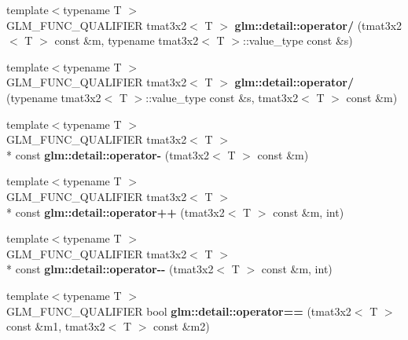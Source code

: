 \begin{DoxyCompactItemize}
\item 
\hypertarget{namespaceglm_1_1detail_abf9a2912b5030543839df113662d0687}{{\footnotesize template$<$typename T $>$ }\\G\-L\-M\-\_\-\-F\-U\-N\-C\-\_\-\-Q\-U\-A\-L\-I\-F\-I\-E\-R tmat3x2$<$ T $>$ {\bfseries glm\-::detail\-::operator/} (tmat3x2$<$ T $>$ const \&m, typename tmat3x2$<$ T $>$\-::value\-\_\-type const \&s)}\label{namespaceglm_1_1detail_abf9a2912b5030543839df113662d0687}

\item 
\hypertarget{namespaceglm_1_1detail_ab6af57d8d78531808ca7412b8b5ac4bd}{{\footnotesize template$<$typename T $>$ }\\G\-L\-M\-\_\-\-F\-U\-N\-C\-\_\-\-Q\-U\-A\-L\-I\-F\-I\-E\-R tmat3x2$<$ T $>$ {\bfseries glm\-::detail\-::operator/} (typename tmat3x2$<$ T $>$\-::value\-\_\-type const \&s, tmat3x2$<$ T $>$ const \&m)}\label{namespaceglm_1_1detail_ab6af57d8d78531808ca7412b8b5ac4bd}

\item 
\hypertarget{namespaceglm_1_1detail_a59b73f54f24948e966ad476164b9acb7}{{\footnotesize template$<$typename T $>$ }\\G\-L\-M\-\_\-\-F\-U\-N\-C\-\_\-\-Q\-U\-A\-L\-I\-F\-I\-E\-R tmat3x2$<$ T $>$\\*
 const {\bfseries glm\-::detail\-::operator-\/} (tmat3x2$<$ T $>$ const \&m)}\label{namespaceglm_1_1detail_a59b73f54f24948e966ad476164b9acb7}

\item 
\hypertarget{namespaceglm_1_1detail_afbedf96a311aecbfd5298ea7ade78b1a}{{\footnotesize template$<$typename T $>$ }\\G\-L\-M\-\_\-\-F\-U\-N\-C\-\_\-\-Q\-U\-A\-L\-I\-F\-I\-E\-R tmat3x2$<$ T $>$\\*
 const {\bfseries glm\-::detail\-::operator++} (tmat3x2$<$ T $>$ const \&m, int)}\label{namespaceglm_1_1detail_afbedf96a311aecbfd5298ea7ade78b1a}

\item 
\hypertarget{namespaceglm_1_1detail_a3643210bac979028c8ee5f440d9d6cab}{{\footnotesize template$<$typename T $>$ }\\G\-L\-M\-\_\-\-F\-U\-N\-C\-\_\-\-Q\-U\-A\-L\-I\-F\-I\-E\-R tmat3x2$<$ T $>$\\*
 const {\bfseries glm\-::detail\-::operator-\/-\/} (tmat3x2$<$ T $>$ const \&m, int)}\label{namespaceglm_1_1detail_a3643210bac979028c8ee5f440d9d6cab}

\item 
\hypertarget{namespaceglm_1_1detail_a711bd8cb73c40bf9f6036f13a8d8201d}{{\footnotesize template$<$typename T $>$ }\\G\-L\-M\-\_\-\-F\-U\-N\-C\-\_\-\-Q\-U\-A\-L\-I\-F\-I\-E\-R bool {\bfseries glm\-::detail\-::operator==} (tmat3x2$<$ T $>$ const \&m1, tmat3x2$<$ T $>$ const \&m2)}\label{namespaceglm_1_1detail_a711bd8cb73c40bf9f6036f13a8d8201d}


\end{DoxyCompactItemize}
